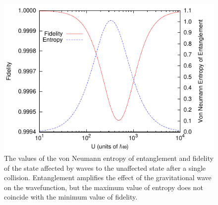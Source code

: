 \begin{figure}[htbp]
  \begin{center}
    \includegraphics[width=120mm]{Images/Uplot.pdf}
    \caption{\label{fig:Uplot} The values of the von Neumann entropy
      of entanglement and fidelity of the state affected by waves to
      the unaffected state after a single collision. Entanglement
      amplifies the effect of the gravitational wave on the
      wavefunction, but the maximum value of entropy does not coincide
      with the minimum value of fidelity.}
  \end{center}
\end{figure}

